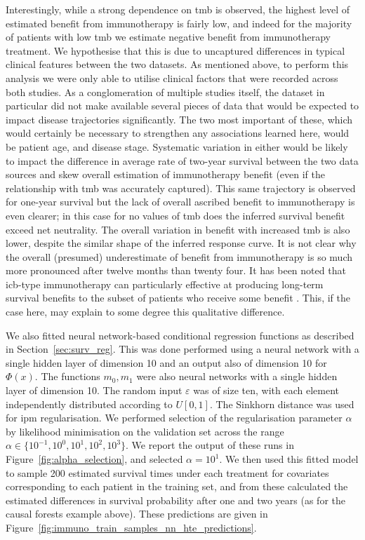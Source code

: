 \documentclass[../thesis.tex]{subfiles}
\begin{document}
Interestingly, while a strong dependence on \gls{tmb} is observed, the highest level of estimated benefit from immunotherapy is fairly low, and indeed for the majority of patients with low \gls{tmb} we estimate negative benefit from immunotherapy treatment. We hypothesise that this is due to uncaptured differences in typical clinical features between the two datasets. As mentioned above, to perform this analysis we were only able to utilise clinical factors that were recorded across both studies. As a conglomeration of multiple studies itself, the \citet{zehir_mutational_2017} dataset in particular did not make available several pieces of data that would be expected to impact disease trajectories significantly. The two most important of these, which would certainly be necessary to strengthen any associations learned here, would be patient age, and disease stage. Systematic variation in either would be likely to impact the difference in average rate of two-year survival between the two data sources and skew overall estimation of immunotherapy benefit (even if the relationship with \gls{tmb} was accurately captured). This same trajectory is observed for one-year survival but the lack of overall ascribed benefit to immunotherapy is even clearer; in this case for no values of \gls{tmb} does the inferred survival benefit exceed net neutrality. The overall variation in benefit with increased \gls{tmb} is also lower, despite the similar shape of the inferred response curve. It is not clear why the overall (presumed) underestimate of benefit from immunotherapy is so much more pronounced after twelve months than twenty four. It has been noted that \gls{icb}-type immunotherapy can particularly effective at producing long-term survival benefits to the subset of patients who receive some benefit \citep{putzu_duration_2023}. This, if the case here, may explain to some degree this qualitative difference. 

We also fitted neural network-based conditional regression functions as described in Section~\ref{sec:surv_reg}. This was done performed using a neural network with a single hidden layer of dimension 10 and an output also of dimension 10 for $\Phi(x)$. The functions $m_0,m_1$ were also neural networks with a single hidden layer of dimension 10. The random input $\varepsilon$ was of size ten, with each element independently distributed according to $U[0,1]$. The Sinkhorn distance \citep{cuturi_sinkhorn_2013} was used for \gls{ipm} regularisation. We performed selection of the regularisation parameter $\alpha$ by likelihood minimisation on the validation set across the range $\alpha \in \{10^{-1}, 10^{0}, 10^1, 10^2, 10^3\}$. We report the output of these runs in Figure~\ref{fig:alpha_selection}, and selected $\alpha = 10^1$. We then used this fitted model to sample 200 estimated survival times under each treatment for covariates corresponding to each patient in the training set, and from these calculated the estimated differences in survival probability after one and two years (as for the causal forests example above). These predictions are given in Figure~\ref{fig:immuno_train_samples_nn_hte_predictions}.
\end{document}

